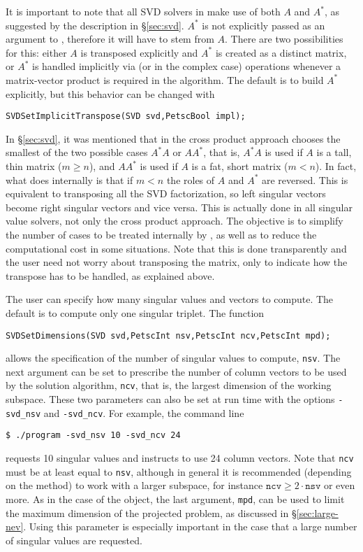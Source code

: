 It is important to note that all SVD solvers in \slepc make use of both $A$ and $A^*$, as suggested by the description in \S\ref{sec:svd}. $A^*$ is not explicitly passed as an argument to , therefore it will have to stem from $A$. There are two possibilities for this: either $A$ is transposed explicitly and $A^*$ is created as a distinct matrix, or $A^*$ is handled implicitly via  (or  in the complex case) operations whenever a matrix-vector product is required in the algorithm. The default is to build $A^*$ explicitly, but this behavior can be changed with
	\begin{Verbatim}[fontsize=\small]
	SVDSetImplicitTranspose(SVD svd,PetscBool impl);
	\end{Verbatim}

In \S\ref{sec:svd}, it was mentioned that in \slepc the cross product approach chooses the smallest of the two possible cases $A^*A$ or $AA^*$, that is, $A^*A$ is used if $A$ is a tall, thin matrix ($m\geq n$), and $AA^*$ is used if $A$ is a fat, short matrix ($m<n$). In fact, what \slepc does internally is that if $m<n$ the roles of $A$ and $A^*$ are reversed. This is equivalent to transposing all the SVD factorization, so left singular vectors become right singular vectors and vice versa. This is actually done in all singular value solvers, not only the cross product approach. The objective is to simplify the number of cases to be treated internally by \slepc, as well as to reduce the computational cost in some situations. Note that this is done transparently and the user need not worry about transposing the matrix, only to indicate how the transpose has to be handled, as explained above.

The user can specify how many singular values and vectors to compute. The default is to compute only one singular triplet. The function
	\begin{Verbatim}[fontsize=\small]
	SVDSetDimensions(SVD svd,PetscInt nsv,PetscInt ncv,PetscInt mpd);
	\end{Verbatim}
allows the specification of the number of singular values to compute, \texttt{nsv}. The next argument can be set to prescribe the number of column vectors to be used by the solution algorithm, \texttt{ncv}, that is, the largest dimension of the working subspace. These two parameters can also be set at run time with the options \Verb!-svd_nsv! and \Verb!-svd_ncv!. For example, the command line
\begin{Verbatim}[fontsize=\small]
	$ ./program -svd_nsv 10 -svd_ncv 24
\end{Verbatim}
requests 10 singular values and instructs to use 24 column vectors. Note that \texttt{ncv} must be at least equal to \texttt{nsv}, although in general it is recommended (depending on the method) to work with a larger subspace, for instance $\mathtt{ncv}\geq2\cdot\mathtt{nsv}$ or even more.
As in the case of the  object, the last argument, \texttt{mpd}, can be used to limit the maximum dimension of the projected problem, as discussed in \S\ref{sec:large-nev}. Using this parameter is especially important in the case that a large number of singular values are requested.

